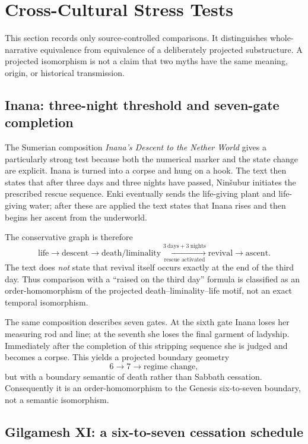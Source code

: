 \section{Cross-Cultural Stress Tests}\label{sec:cross-cultural}

This section records only source-controlled comparisons.  It distinguishes
whole-narrative equivalence from equivalence of a deliberately projected
substructure.  A projected isomorphism is not a claim that two myths have the
same meaning, origin, or historical transmission.

\subsection{Inana: three-night threshold and seven-gate completion}

The Sumerian composition \emph{Inana's Descent to the Nether World} gives a
particularly strong test because both the numerical marker and the state
change are explicit.  Inana is turned into a corpse and hung on a hook.  The
text then states that after three days and three nights have passed,
Nin\v{s}ubur initiates the prescribed rescue sequence.  Enki eventually sends
the life-giving plant and life-giving water; after these are applied the text
states that Inana rises and then begins her ascent from the underworld.

The conservative graph is therefore
\[
\mathrm{life}\to\mathrm{descent}\to\mathrm{death/liminality}
\xrightarrow[\text{rescue activated}]{3\ \mathrm{days}+3\ \mathrm{nights}}
\mathrm{revival}\to\mathrm{ascent}.
\]
The text does \emph{not} state that revival itself occurs exactly at the end of
the third day.  Thus comparison with a ``raised on the third day'' formula is
classified as an order-homomorphism of the projected death--liminality--life
motif, not an exact temporal isomorphism.

The same composition describes seven gates.  At the sixth gate Inana loses
her measuring rod and line; at the seventh she loses the final garment of
ladyship.  Immediately after the completion of this stripping sequence she is
judged and becomes a corpse.  This yields a projected boundary geometry
\[
6\longrightarrow7\longrightarrow\text{regime change},
\]
but with a boundary semantic of death rather than Sabbath cessation.
Consequently it is an order-homomorphism to the Genesis six-to-seven boundary,
not a semantic isomorphism.

\subsection{Gilgamesh XI: a six-to-seven cessation schedule}

